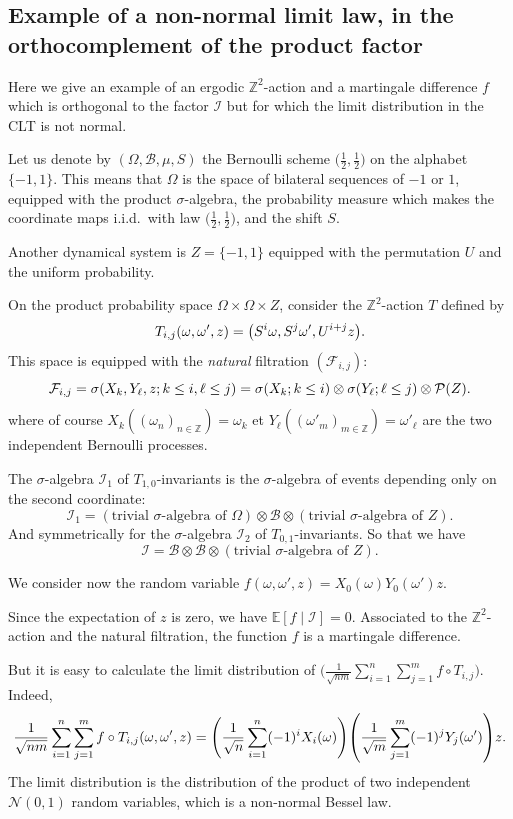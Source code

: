 \documentclass[AHL,Unicode,longabstracts,published]{cedram}
\newcommand{\Z}{\mathbb{Z}}
\newcommand{\bbE}{\mathbb{E}}
\newcommand*\I{\mathcal{I}}
\newcommand*\B{\mathcal{B}}
\newcommand*\F{\mathcal{F}}
\renewcommand*\P{\mathcal{P}}
\newcommand*\clN{\mathcal{N}}
\let\originalleft\left
\let\originalright\right
\renewcommand{\left}{\mathopen{}\mathclose\bgroup\originalleft}
\renewcommand{\right}{\aftergroup\egroup\originalright}
\begin{document}
\subsection{Example of a non-normal limit law, in the orthocomplement of the product factor}\label{nnormal_ex}
Here we give an example of an ergodic $\Z^2$-action and a martingale difference $f$ which is orthogonal to the factor $\I$ but for which the limit distribution in the CLT is not normal.

Let us denote by $(\Omega,\B,\mu,S)$ the Bernoulli scheme $\bigl(\frac12,\frac12\bigr)$ on the alphabet $\{-1,1\}$. This means that $\Omega$ is the space of bilateral sequences of $-1$ or $1$, equipped with the product $\sigma$-algebra, the probability measure which makes the coordinate maps i.i.d.\ with law $\bigl(\frac12,\frac12\bigr)$, and the shift $S$.

Another dynamical system is $Z=\{-1,1\}$ equipped with the permutation $U$ and the uniform probability.

On the product probability space $\Omega\times\Omega\times Z$, consider the $\Z^2$-action $T$ defined by
\[
T_{i,j}(\omega,\omega',z)=\left(S^i\omega,S^j\omega',U^{i+j}z\right).
\]
This space is equipped with the \emph{natural} filtration $(\F_{i,j})$:
\[
\F_{i,j}=\sigma\left(X_k,Y_\ell,z ; k\leq i, \ell\leq j\right)=\sigma\left(X_k ; k\leq i\right)\otimes\sigma\left(Y_\ell ; \ell\leq j\right)\otimes\P(Z).
\]
where of course $X_k((\omega_n)_{n\in\Z})=\omega_k$ et $Y_\ell((\omega'_m)_{m\in\Z})=\omega'_\ell$ are the two independent Bernoulli processes.

The $\sigma$-algebra $\I_1$ of $T_{1,0}$-invariants is the $\sigma$-algebra of events depending only on the second coordinate:
\[
\I_1= (\text{trivial $\sigma$-algebra of $\Omega$})\otimes\B\otimes(\text{trivial $\sigma$-algebra of $Z$}).
\]
And symmetrically for the $\sigma$-algebra $\I_2$ of $T_{0,1}$-invariants. So that we have
\[
\I=\B\otimes\B\otimes(\text{trivial $\sigma$-algebra of $Z$}).
\]

We consider now the random variable $f(\omega,\omega',z)=X_0(\omega)Y_0(\omega')z$.

Since the expectation of $z$ is zero, we have $\bbE[f\mid\I]=0$. Associated to the $\Z^2$-action and the natural filtration, the function $f$ is a martingale difference.

But it is easy to calculate the limit distribution of $\bigl(\frac1{\sqrt{nm}}\sum_{i=1}^n\sum_{j=1}^m f\circ{T_{i,j}}\bigr)$. Indeed,
\[
\frac1{\sqrt{nm}}\sum_{i=1}^n\sum_{j=1}^m f\circ{T_{i,j}}(\omega,\omega',z)=\left(\frac1{\sqrt{n}}\sum_{i=1}^n(-1)^iX_i(\omega)\right)\left(\frac1{\sqrt{m}}\sum_{j=1}^m(-1)^jY_j(\omega')\right)z.
\]
The limit distribution is the distribution of the product of two independent $\clN(0,1)$ random variables, which is a non-normal Bessel law.
\end{document}
